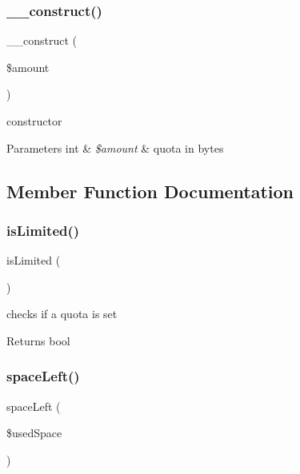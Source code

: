 \subsubsection{\texorpdfstring{\+\_\+\+\_\+construct()}{\_\_construct()}}
{\footnotesize\ttfamily \+\_\+\+\_\+construct (\begin{DoxyParamCaption}\item[{}]{\$amount }\end{DoxyParamCaption})}

constructor


\begin{DoxyParams}[1]{Parameters}
int & {\em \$amount} & quota in bytes \\
\hline
\end{DoxyParams}


\subsection{Member Function Documentation}
\mbox{\label{classorg_1_1bovigo_1_1vfs_1_1_quota_a7414df3a1c36d91a5b2fc716d469abbb}} 
\subsubsection{\texorpdfstring{is\+Limited()}{isLimited()}}
{\footnotesize\ttfamily is\+Limited (\begin{DoxyParamCaption}{ }\end{DoxyParamCaption})}

checks if a quota is set

\begin{DoxyReturn}{Returns}
bool 
\end{DoxyReturn}
\mbox{\label{classorg_1_1bovigo_1_1vfs_1_1_quota_a1f6bf311f89fadba1116be119e438fdb}} 
\subsubsection{\texorpdfstring{space\+Left()}{spaceLeft()}}
{\footnotesize\ttfamily space\+Left (\begin{DoxyParamCaption}\item[{}]{\$used\+Space }\end{DoxyParamCaption})}


